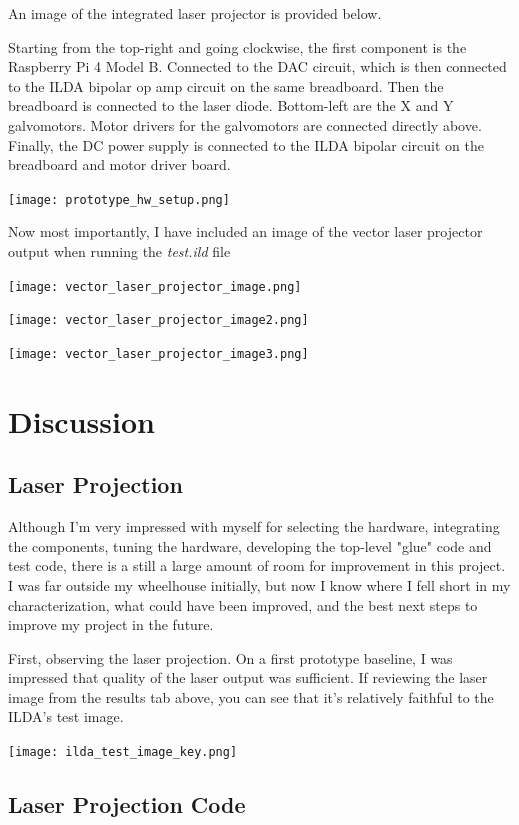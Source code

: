 \documentclass[journal]{IEEEtran}
\begin{document}
    An image of the integrated laser projector is provided below.

    Starting from the top-right and going clockwise, the first component is the Raspberry Pi 4 Model B.
    Connected to the DAC circuit, which is then connected to the ILDA bipolar op amp circuit on the same breadboard.
    Then the breadboard is connected to the laser diode.
    Bottom-left are the X and Y galvomotors.
    Motor drivers for the galvomotors are connected directly above. 
    Finally, the DC power supply is connected to the ILDA bipolar circuit on the breadboard and motor driver board.

    \texttt{[image: prototype\_hw\_setup.png]}

    Now most importantly, I have included an image of the vector laser projector output when running the \emph{test.ild} file

    \texttt{[image: vector\_laser\_projector\_image.png]}

    \texttt{[image: vector\_laser\_projector\_image2.png]}

    \texttt{[image: vector\_laser\_projector\_image3.png]}


    \section{Discussion}
    \subsection{Laser Projection}
    
    Although I'm very impressed with myself for selecting the hardware, integrating the components, tuning the hardware, developing the top-level "glue" code and test code, there is a still a large amount of room for improvement in this project.
    I was far outside my wheelhouse initially, but now I know where I fell short in my characterization, what could have been improved, and the best next steps to improve my project in the future.

    First, observing the laser projection.
    On a first prototype baseline, I was impressed that quality of the laser output was sufficient.
    If reviewing the laser image from the results tab above, you can see that it's relatively faithful to the ILDA's test image.

    \texttt{[image: ilda\_test\_image\_key.png]}

    \subsection{Laser Projection Code}
    
\end{document}
